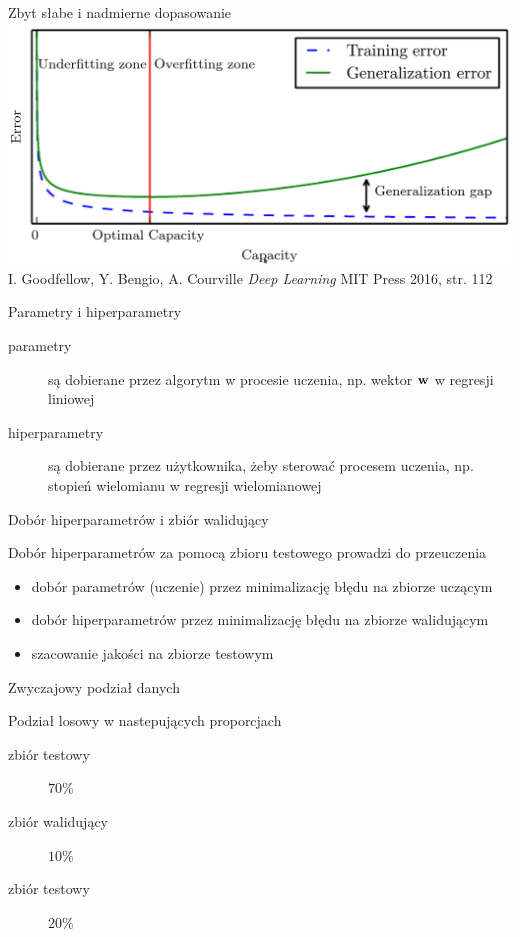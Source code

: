 \documentclass{sa}
\renewcommand{\vec}[1]{\ensuremath\mathbf{#1}}
\begin{document}
\begin{frame}{Zbyt słabe i nadmierne dopasowanie}
\includegraphics[width=\textwidth]{underfitting-overfitting.png}
\vfill
{\footnotesize I. Goodfellow, Y. Bengio, A. Courville \emph{Deep Learning} MIT Press 2016, str. 112}
\end{frame}

\begin{frame}{Parametry i hiperparametry}
\begin{description}
\item[parametry] są dobierane przez algorytm w procesie uczenia, np. wektor $\vec{w}$ w regresji liniowej
\item[hiperparametry] są dobierane przez użytkownika, żeby sterować procesem uczenia, np. stopień wielomianu w regresji wielomianowej
\end{description}
\end{frame}

\begin{frame}{Dobór hiperparametrów i zbiór walidujący}
\begin{block}{}
Dobór hiperparametrów za pomocą zbioru testowego prowadzi do przeuczenia
\end{block}

\pause
\vfill

\begin{itemize}
\item dobór \alert{parametrów} (uczenie) przez minimalizację błędu na zbiorze \alert{uczącym}
\item dobór \alert{hiperparametrów} przez minimalizację błędu na zbiorze \alert{walidującym}
\item szacowanie jakości na zbiorze \alert{testowym}
\end{itemize}
\end{frame}

\begin{frame}{Zwyczajowy podział danych}

Podział losowy w nastepujących proporcjach
\begin{description}
\item[zbiór testowy] $70\%$
\item[zbiór walidujący] $10\%$
\item[zbiór testowy] $20\%$
\end{description}
\end{frame}
\end{document}
